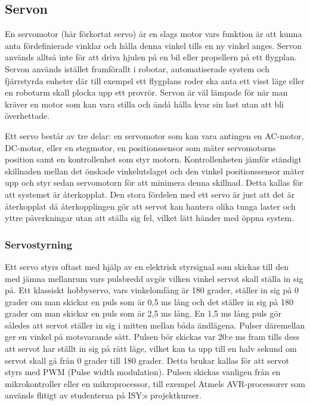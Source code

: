 \documentclass[a4paper,12pt]{article}
\begin{document}
\subsection{Servon}
En servomotor (här förkortat servo) är en slags motor vars funktion är att kunna anta fördefinierade  vinklar och hålla denna vinkel tills en ny vinkel anges. Servon används alltså inte för att driva hjulen på en bil eller propellern på ett flygplan. Servon används istället framförallt i robotar, automatiserade system  och fjärrstyrda enheter där till exempel ett flygplans roder ska anta ett visst läge eller en robotarm skall plocka upp ett provrör. Servon är väl lämpade för när man kräver en motor som kan vara stilla och ändå hålla kvar sin last utan att bli överhettade. 
 
Ett servo består av tre delar: en servomotor som kan vara antingen en AC-motor, DC-motor, eller en stegmotor, en positionssensor som mäter servomotorns position samt en kontrollenhet som styr motorn.  Kontrollenheten jämför ständigt skillnaden mellan det önskade vinkelutslaget och den vinkel positionssensor mäter upp och styr sedan servomotorn för att minimera denna skillnad. Detta kallas för att systemet är återkopplat. Den stora fördelen med ett servo är just att det är återkopplat då återkopplingen gör att servot kan hantera olika tunga laster och yttre påverkningar utan att ställa sig fel, vilket lätt händer med öppna system. 
 
\subsubsection{Servostyrning}
Ett servo styrs oftast  med hjälp av en elektrisk styrsignal som skickas till den med jämna mellanrum vars pulsbredd avgör vilken vinkel servot skall ställa in sig på. Ett klassiskt hobbyservo, vars vinkelomfång är 180 grader, ställer in sig på 0 grader om man skickar en puls som är 0,5 ms lång och det ställer in sig på 180 grader om man skickar en puls som är 2,5 ms lång. En 1,5 ms lång puls gör således att servot ställer in sig i mitten mellan båda ändlägena. Pulser däremellan ger en vinkel på motsvarande sätt. Pulsen bör skickas var 20:e ms fram tills dess att servot har ställt in sig på rätt läge, vilket kan ta upp till en halv sekund om servot skall gå från 0 grader till 180 grader. Detta brukar kallas för att servot styrs med PWM (Pulse width modulation). Pulsen skickas vanligen från en mikrokontroller eller en mikroprocessor, till exempel Atmels AVR-processorer som används flitigt av studenterna på ISY:s projektkurser.
 
\end{document}
